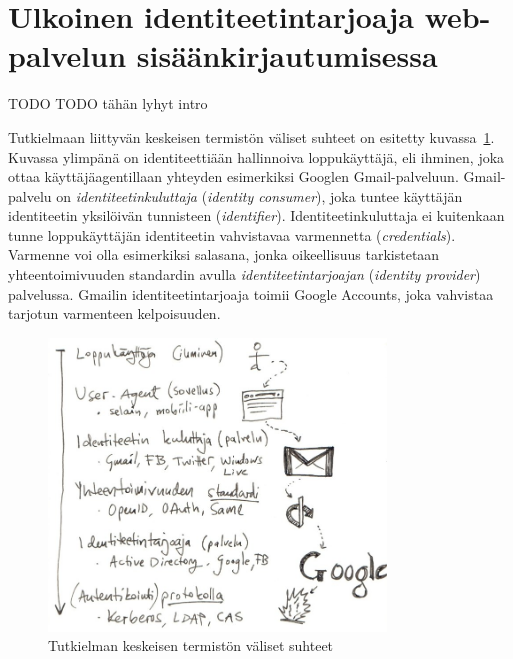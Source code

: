 \documentclass[finnish,gradu]{tktltiki}
\begin{document}


\newpage
\section{Ulkoinen identiteetintarjoaja web-palvelun sisäänkirjautumisessa} %
\label{sec:kakkosluku}



TODO TODO tähän lyhyt intro

Tutkielmaan liittyvän keskeisen termistön väliset suhteet on esitetty kuvassa~\ref{fig:yleiskuva_termien_suhteista}. Kuvassa ylimpänä on identiteettiään hallinnoiva loppukäyttäjä, eli ihminen, joka ottaa käyttäjäagentillaan yhteyden esimerkiksi Googlen Gmail-palveluun. Gmail-palvelu on \emph{identiteetinkuluttaja} (\emph{identity consumer}), joka tuntee käyttäjän identiteetin yksilöivän tunnisteen (\emph{identifier}). Identiteetinkuluttaja ei kuitenkaan tunne loppukäyttäjän identiteetin vahvistavaa varmennetta (\emph{credentials}). Varmenne voi olla esimerkiksi salasana, jonka oikeellisuus tarkistetaan yhteentoimivuuden standardin avulla \emph{identiteetintarjoajan} (\emph{identity provider}) palvelussa. Gmailin identiteetintarjoaja toimii Google Accounts, joka vahvistaa tarjotun varmenteen kelpoisuuden.

\begin{figure}[h!]
  \centering
  \includegraphics[width=0.8\textwidth]{images/auth_yleiskuva.jpg}
  \caption{Tutkielman keskeisen termistön väliset suhteet}
  \label{fig:yleiskuva_termien_suhteista}
\end{figure}
\end{document}

